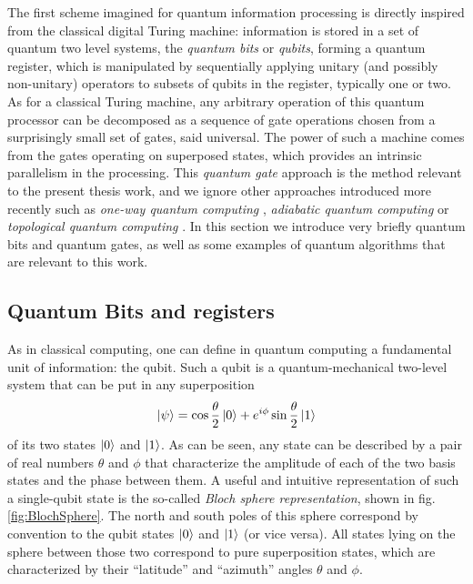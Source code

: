 The first scheme imagined for quantum information processing is directly inspired from the classical digital Turing machine: information is stored in a set of quantum two level systems, the {\it quantum bits} or {\it qubits}, forming a quantum register, which is manipulated by sequentially applying unitary (and possibly non-unitary) operators to subsets of qubits in the register, typically one or two. As for a classical Turing machine, any arbitrary operation of this quantum processor can be decomposed as a sequence of gate operations chosen from a surprisingly small set of gates, said universal. The power of such a machine comes from the gates operating on superposed states, which provides an intrinsic parallelism in the processing.
\smallskip
This {\it quantum gate} approach is the method relevant to the present thesis work, and we ignore other approaches introduced more recently such as {\it one-way quantum computing} \citep{raussendorf_one-way_2001}, {\it adiabatic quantum computing} \citep{farhi_quantum_2000} or {\it topological quantum computing} \citep{kitaev_fault-tolerant_2003}. In this section we introduce very briefly quantum bits and quantum gates, as well as some examples of quantum algorithms that are relevant to this work.


\subsection{Quantum Bits and registers}

As in classical computing, one can define in quantum computing a fundamental unit of information: the qubit. Such a qubit is a quantum-mechanical two-level system that can be put in any superposition
%
\begin{equation}
\left| \psi \right> = \cos{\frac{\theta}{2}}\left| 0 \right>+e^{i\phi}\sin{\frac{\theta}{2}}\left| 1 \right>
\end{equation}
%
of its two states $\left| 0 \right>$ and $\left| 1 \right>$.
As can be seen, any state can be described by a pair of real numbers $\theta$ and $\phi$ that characterize the amplitude of each of the two basis states and the phase between them. A useful and intuitive representation of such a single-qubit state is the so-called {\it Bloch sphere representation}, shown in fig. \ref{fig:BlochSphere}. The north and south poles of this sphere correspond by convention to the qubit states $\left| 0 \right>$ and $\left| 1 \right>$ (or vice versa). All states lying on the sphere between those two correspond to pure superposition states, which are characterized by their ``latitude'' and ``azimuth'' angles $\theta$ and $\phi$. 

